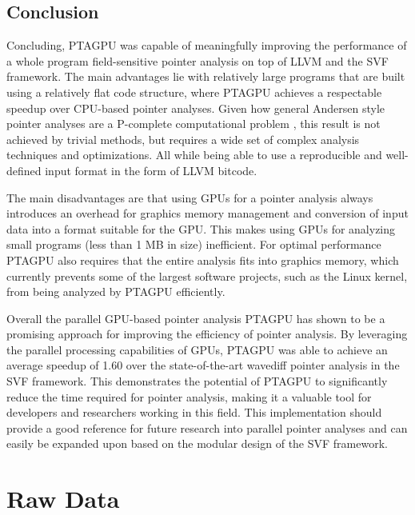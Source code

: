 \section{Conclusion}
Concluding, PTAGPU was capable of meaningfully improving the performance of a whole program field-sensitive pointer analysis on top of LLVM and the SVF framework.
The main advantages lie with relatively large programs that are built using a relatively flat code structure, where PTAGPU achieves a respectable speedup over CPU-based pointer analyses.
Given how general Andersen style pointer analyses are a P-complete computational problem \cite{mathiasen2021fine}, this result is not achieved by trivial methods, but requires a wide set of complex analysis techniques and optimizations. All while being able to use a reproducible and well-defined input format in the form of LLVM bitcode.

The main disadvantages are that using GPUs for a pointer analysis always introduces an overhead for graphics memory management and conversion of input data into a format suitable for the GPU.
This makes using GPUs for analyzing small programs (less than 1 MB in size) inefficient.
For optimal performance PTAGPU also requires that the entire analysis fits into graphics memory, which currently prevents some of the largest software projects, such as the Linux kernel, from being analyzed by PTAGPU efficiently.

Overall the parallel GPU-based pointer analysis PTAGPU has shown to be a promising approach for improving the efficiency of pointer analysis. By leveraging the parallel processing capabilities of GPUs, PTAGPU was able to achieve an average speedup of 1.60 over the state-of-the-art wavediff pointer analysis in the SVF framework. This demonstrates the potential of PTAGPU to significantly reduce the time required for pointer analysis, making it a valuable tool for developers and researchers working in this field.
This implementation should provide a good reference for future research into parallel pointer analyses and can easily be expanded upon based on the modular design of the SVF framework.
\appendix

\chapter{Raw Data}

